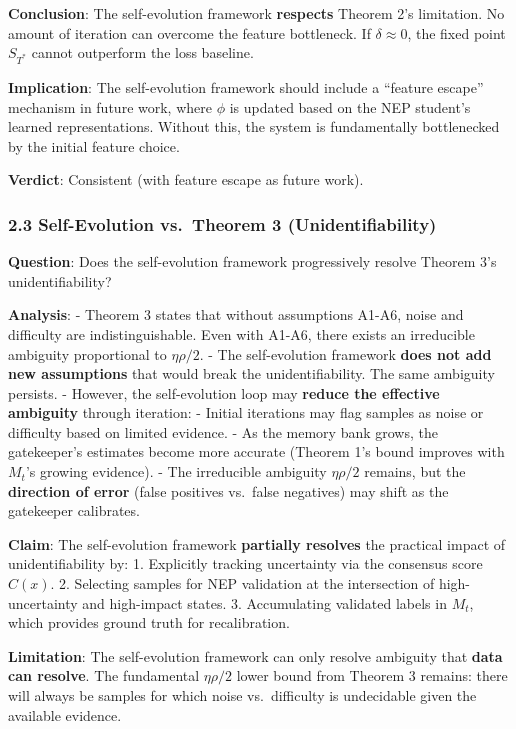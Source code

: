 \documentclass[
  12pt,
]{ctexart}
\begin{document}
\textbf{Conclusion}: The self-evolution framework \textbf{respects}
Theorem 2's limitation. No amount of iteration can overcome the feature
bottleneck. If \(\delta \approx 0\), the fixed point \(S_{T^*}\) cannot
outperform the loss baseline.

\textbf{Implication}: The self-evolution framework should include a
``feature escape'' mechanism in future work, where \(\phi\) is updated
based on the NEP student's learned representations. Without this, the
system is fundamentally bottlenecked by the initial feature choice.

\textbf{Verdict}: Consistent (with feature escape as future work).

\subsubsection{2.3 Self-Evolution vs.~Theorem 3
(Unidentifiability)}\label{self-evolution-vs.-theorem-3-unidentifiability}

\textbf{Question}: Does the self-evolution framework progressively
resolve Theorem 3's unidentifiability?

\textbf{Analysis}: - Theorem 3 states that without assumptions A1-A6,
noise and difficulty are indistinguishable. Even with A1-A6, there
exists an irreducible ambiguity proportional to \(\eta\rho/2\). - The
self-evolution framework \textbf{does not add new assumptions} that
would break the unidentifiability. The same ambiguity persists. -
However, the self-evolution loop may \textbf{reduce the effective
ambiguity} through iteration: - Initial iterations may flag samples as
noise or difficulty based on limited evidence. - As the memory bank
grows, the gatekeeper's estimates become more accurate (Theorem 1's
bound improves with \(M_t\)'s growing evidence). - The irreducible
ambiguity \(\eta\rho/2\) remains, but the \textbf{direction of error}
(false positives vs.~false negatives) may shift as the gatekeeper
calibrates.

\textbf{Claim}: The self-evolution framework \textbf{partially resolves}
the practical impact of unidentifiability by: 1. Explicitly tracking
uncertainty via the consensus score \(C(x)\). 2. Selecting samples for
NEP validation at the intersection of high-uncertainty and high-impact
states. 3. Accumulating validated labels in \(M_t\), which provides
ground truth for recalibration.

\textbf{Limitation}: The self-evolution framework can only resolve
ambiguity that \textbf{data can resolve}. The fundamental \(\eta\rho/2\)
lower bound from Theorem 3 remains: there will always be samples for
which noise vs.~difficulty is undecidable given the available evidence.
\end{document}
